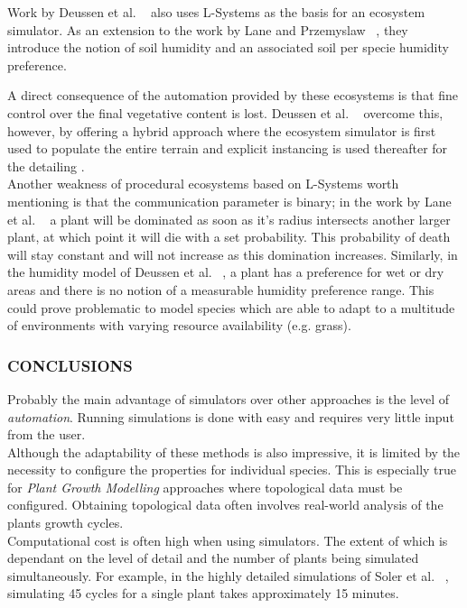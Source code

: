 Work by Deussen et al. ~\cite{Deussen1998} also uses L-Systems as the basis for an ecosystem simulator. As an extension to the work by Lane and Przemyslaw ~\cite{Lane2002}, they introduce the notion of soil humidity and an associated soil per specie humidity preference.

A direct consequence of the automation provided by these ecosystems is that fine control over the final vegetative content is lost. Deussen et al. ~\cite{Deussen1998} overcome this, however, by offering a hybrid approach where the ecosystem simulator is first used to populate the entire terrain and explicit instancing is used thereafter for the detailing .\\

Another weakness of procedural ecosystems based on L-Systems worth mentioning is that the communication parameter is binary; in the work by Lane et al. ~\cite{Lane2002} a plant will be dominated as soon as it’s radius intersects another larger plant, at which point it will die with a set probability. This probability of death will stay constant and will not increase as this domination increases. Similarly, in the humidity model of Deussen et al. ~\cite{Deussen1998}, a plant has a preference for wet or dry areas and there is no notion of a measurable humidity preference range. This could prove problematic to model species which are able to adapt to a multitude of environments with varying resource availability (e.g. grass). \\

\subsubsection{CONCLUSIONS}
Probably the main advantage of simulators over other approaches is the level of \textit{automation}. Running simulations is done with easy and requires very little input from the user. \\
Although the adaptability of these methods is also impressive, it is limited by the necessity to configure the properties for individual species. This is especially true for \textit{Plant Growth Modelling} approaches where topological data must be configured. Obtaining topological data often involves real-world analysis of the plants growth cycles. \\
Computational cost is often high when using simulators. The extent of which is dependant on the level of detail and the number of plants being simulated simultaneously. For example, in the highly detailed simulations of Soler et al. ~\cite{Soler2001}, simulating 45 cycles for a single plant takes approximately 15 minutes.\\

